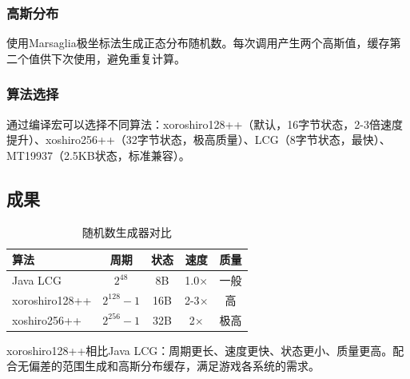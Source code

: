 \subsubsection{高斯分布}

使用Marsaglia极坐标法生成正态分布随机数。每次调用产生两个高斯值，缓存第二个值供下次使用，避免重复计算。

\subsubsection{算法选择}

通过编译宏可以选择不同算法：xoroshiro128++（默认，16字节状态，2-3倍速度提升）、xoshiro256++（32字节状态，极高质量）、LCG（8字节状态，最快）、MT19937（2.5KB状态，标准兼容）。

\subsection{成果}

\begin{table}[h]
\centering
\caption{随机数生成器对比}
\label{tab:random_comparison}
\begin{tabular}{lcccc}
\toprule
\textbf{算法} & \textbf{周期} & \textbf{状态} & \textbf{速度} & \textbf{质量} \\
\midrule
Java LCG & $2^{48}$ & 8B & 1.0$\times$ & 一般 \\
xoroshiro128++ & $2^{128}-1$ & 16B & 2-3$\times$ & 高 \\
xoshiro256++ & $2^{256}-1$ & 32B & 2$\times$ & 极高 \\
\bottomrule
\end{tabular}
\end{table}

xoroshiro128++相比Java LCG：周期更长、速度更快、状态更小、质量更高。配合无偏差的范围生成和高斯分布缓存，满足游戏各系统的需求。
